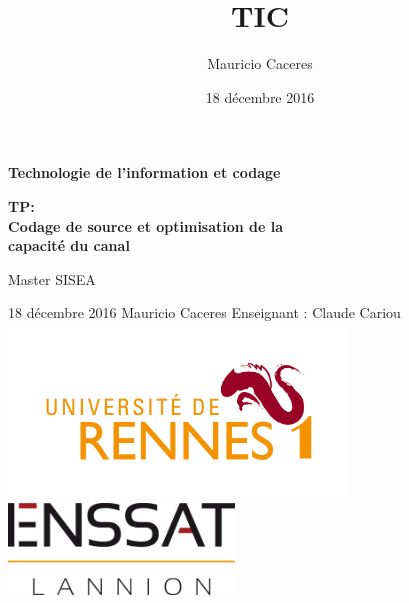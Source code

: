 \documentclass{report}
\title{TIC}
\author{Mauricio Caceres}
\date{18 décembre 2016}
\begin{document}
\begin{titlepage}
	\centering
	\vfill
{\bfseries\huge Technologie de l'information et codage}
	\vfill
	{\bfseries\LARGE
		TP:\\
		Codage de source et optimisation de la \\capacité du canal
		\\
		\vskip2cm

		Master SISEA\\
	
	}
	\vfill
	18 décembre 2016
	\vfill
	{\large Mauricio Caceres } \hfill  {\large Enseignant : Claude Cariou}
	\vfill
	\includegraphics[width=9cm]{rennes} %
	\vfill
	\includegraphics[width=6cm]{enssat} %
	\vfill
	\vfill
\end{titlepage}
\tableofcontents




\end{document}
